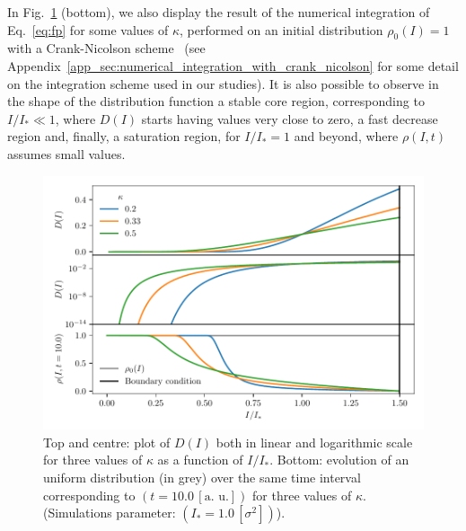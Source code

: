 In Fig.~\ref{fig:1} (bottom), we also display the result of the numerical integration of Eq.~\eqref{eq:fp} for some values of $\kappa$, performed on an initial distribution $\rho_0(I)=1$ with a Crank-Nicolson scheme~\cite{crank1947practical} (see Appendix~\ref{app_sec:numerical_integration_with_crank_nicolson} for some detail on the integration scheme used in our studies).
It is also possible to observe in the shape of the distribution function a stable core region, corresponding to $I/I_\ast \ll 1$, where $D(I)$ starts having values very close to zero, a fast decrease region and, finally, a saturation region, for $I/I_\ast = 1$ and beyond, where $\rho(I, t)$ assumes small values.

\begin{figure}[htp]
    \centering
    \includegraphics[width=\textwidth]{4_probing_the_diffusive_behavior/figs/diffusion_coefficient.pdf}
    \caption{Top and centre: plot of $D(I)$ both in linear and logarithmic scale for three values of $\kappa$ as a function of $I/I_\ast$.
    Bottom: evolution of an uniform distribution (in grey) over the same time interval corresponding to $(t=10.0 \, [\text{a. u.}])$ for three values of $\kappa$. (Simulations parameter: $(I_\ast = 1.0\,[\sigma^2])$).}
    \label{fig:1}
\end{figure}



